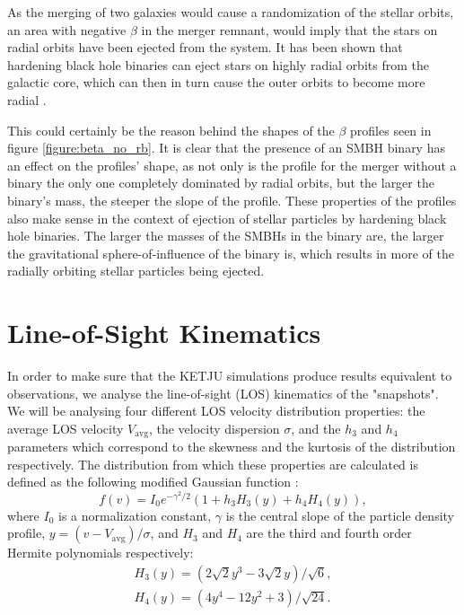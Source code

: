 \documentclass[english, oneside]{HYgradu}
\begin{document}
As the merging of two galaxies would cause a randomization of the stellar orbits, an area with negative $\beta$ in the merger remnant, would imply that the stars on radial orbits have been ejected from the system. It has been shown that hardening black hole binaries can eject stars on highly radial orbits from the galactic core, which can then in turn cause the outer orbits to become more radial \citep{Quinlan1997, Milosavljevic2001, Thomas2014}.

This could certainly be the reason behind the shapes of the $\beta$ profiles seen in figure \ref{figure:beta_no_rb}. It is clear that the presence of an SMBH binary has an effect on the profiles' shape, as not only is the profile for the merger without a binary the only one completely dominated by radial orbits, but the larger the binary's mass, the steeper the slope of the profile. These properties of the profiles also make sense in the context of ejection of stellar particles by hardening black hole binaries. The larger the masses of the SMBHs in the binary are, the larger the gravitational sphere-of-influence of the binary is, which results in more of the radially orbiting stellar particles being ejected.


\section{Line-of-Sight Kinematics}

In order to make sure that the KETJU simulations produce results equivalent to observations, we analyse the line-of-sight (LOS) kinematics of the "snapshots". We will be analysing four different LOS velocity distribution properties: the average LOS velocity $V_\mathrm{avg}$, the velocity dispersion $\sigma$, and the $h_3$ and $h_4$ parameters which correspond to the skewness and the kurtosis of the distribution respectively. The distribution from which these properties are calculated is defined as the following modified Gaussian function \citep{Rantala2018}:
\begin{equation}
f(v) = I_0 e^{-\gamma^2/2}(1 + h_3 H_3(y) + h_4 H_4(y)), \label{eq:mod_gaussian}
\end{equation} 
where $I_0$ is a normalization constant, $\gamma$ is the central slope of the particle density profile, $y = (v - V_\mathrm{avg})/\sigma$, and $H_3$ and $H_4$ are the third and fourth order Hermite polynomials respectively:
\begin{eqnarray}
H_3(y) = \left(2\sqrt{2}y^3 - 3\sqrt{2}y\right) / \sqrt{6}, \\
H_4(y) = \left(4y^4 - 12y^2 + 3 \right) / \sqrt{24}.
\end{eqnarray}
\end{document}
